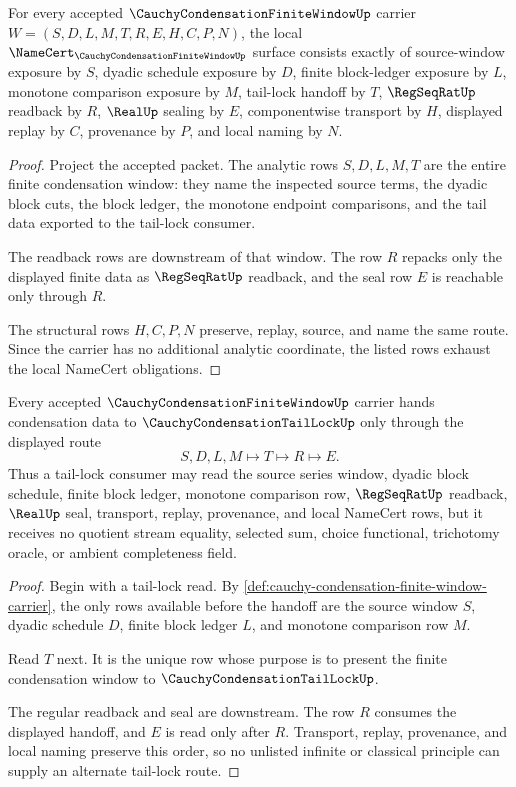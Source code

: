 \begin{theorem}
\label{thm:cauchy-condensation-finite-window-namecert-obligations}
For every accepted $\CauchyCondensationFiniteWindowUp$ carrier $W=(S,D,L,M,T,R,E,H,C,P,N)$, the local $\NameCert_{\CauchyCondensationFiniteWindowUp}$ surface consists exactly of source-window exposure by $S$, dyadic schedule exposure by $D$, finite block-ledger exposure by $L$, monotone comparison exposure by $M$, tail-lock handoff by $T$, $\RegSeqRatUp$ readback by $R$, $\RealUp$ sealing by $E$, componentwise transport by $H$, displayed replay by $C$, provenance by $P$, and local naming by $N$.
\end{theorem}
\begin{proof}
Project the accepted packet. The analytic rows $S,D,L,M,T$ are the entire finite condensation window: they name the inspected source terms, the dyadic block cuts, the block ledger, the monotone endpoint comparisons, and the tail data exported to the tail-lock consumer.

The readback rows are downstream of that window. The row $R$ repacks only the displayed finite data as $\RegSeqRatUp$ readback, and the seal row $E$ is reachable only through $R$.

The structural rows $H,C,P,N$ preserve, replay, source, and name the same route. Since the carrier has no additional analytic coordinate, the listed rows exhaust the local NameCert obligations.
\end{proof}

\begin{theorem}
\label{thm:cauchy-condensation-finite-window-tail-lock-handoff}
Every accepted $\CauchyCondensationFiniteWindowUp$ carrier hands condensation data to $\CauchyCondensationTailLockUp$ only through the displayed route
$$
S,D,L,M \longmapsto T \longmapsto R \longmapsto E .
$$
Thus a tail-lock consumer may read the source series window, dyadic block schedule, finite block ledger, monotone comparison row, $\RegSeqRatUp$ readback, $\RealUp$ seal, transport, replay, provenance, and local NameCert rows, but it receives no quotient stream equality, selected sum, choice functional, trichotomy oracle, or ambient completeness field.
\end{theorem}
\begin{proof}
Begin with a tail-lock read. By \autoref{def:cauchy-condensation-finite-window-carrier}, the only rows available before the handoff are the source window $S$, dyadic schedule $D$, finite block ledger $L$, and monotone comparison row $M$.

Read $T$ next. It is the unique row whose purpose is to present the finite condensation window to $\CauchyCondensationTailLockUp$.

The regular readback and seal are downstream. The row $R$ consumes the displayed handoff, and $E$ is read only after $R$. Transport, replay, provenance, and local naming preserve this order, so no unlisted infinite or classical principle can supply an alternate tail-lock route.
\end{proof}

